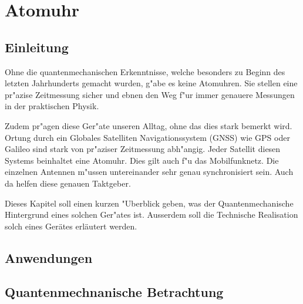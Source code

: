 \chapter{Atomuhr\label{chapter:atomuhr}}
\begin{refsection}

\section{Einleitung}
%

Ohne die quantenmechanischen Erkenntnisse, welche besonders zu Beginn des letzten Jahrhunderts gemacht wurden, g"abe es keine Atomuhren. 
Sie stellen eine pr"azise Zeitmessung sicher und ebnen den Weg f"ur immer genauere Messungen in der praktischen Physik. 

Zudem pr"agen diese Ger"ate unseren Alltag, ohne das dies stark bemerkt wird. 
Ortung durch ein Globales Satelliten Navigationssystem (GNSS) wie GPS oder Galileo sind stark von pr"aziser Zeitmessung abh"angig. 
Jeder Satellit diesen Systems beinhaltet eine Atomuhr.
Dies gilt auch f"u das Mobilfunknetz. Die einzelnen Antennen m"ussen untereinander sehr genau synchronisiert sein. Auch da helfen diese genauen Taktgeber.

Dieses Kapitel soll einen kurzen "Uberblick geben, was der Quantenmechanische Hintergrund eines solchen Ger"ates ist. Ausserdem soll die Technische Realisation solch eines Gerätes erläutert werden.
\section{Anwendungen}

\section{Quantenmechnanische Betrachtung}


\end{refsection}
